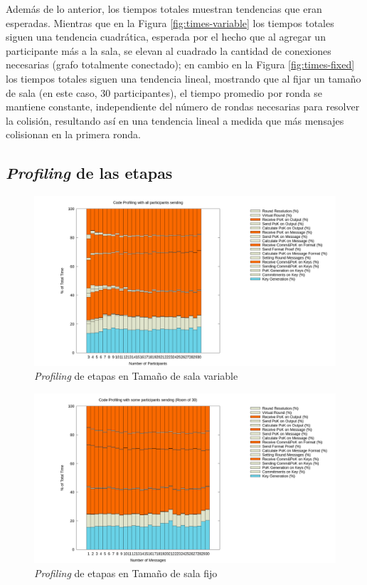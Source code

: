 Además de lo anterior, los tiempos totales muestran 
tendencias que eran esperadas. Mientras que en la Figura 
\ref{fig:times-variable} los tiempos totales siguen una tendencia 
cuadrática, esperada por el hecho que al agregar un participante más a la 
sala, se elevan al cuadrado la cantidad de conexiones necesarias (grafo 
totalmente conectado); en cambio en la Figura \ref{fig:times-fixed} 
los tiempos totales siguen una tendencia lineal, mostrando que al fijar un 
tamaño de sala (en este caso, 30 participantes), el tiempo promedio por ronda 
se mantiene constante, independiente del número de rondas necesarias para 
resolver la colisión, resultando así en una tendencia lineal a medida que 
más mensajes colisionan en la primera ronda.

\subsection{\emph{Profiling} de las etapas}

\begin{figure}[H]
  \centering
    \includegraphics[scale=0.25]{logs/logs_all/profile.png}
  \caption{\emph{Profiling} de etapas en Tamaño de sala variable}
  \label{fig:profile-variable}
\end{figure}

\begin{figure}[H]
  \centering
    \includegraphics[scale=0.25]{logs/logs_partial_30/profile.png}
  \caption{\emph{Profiling} de etapas en Tamaño de sala fijo}
  \label{fig:profile-fixed}
\end{figure}

